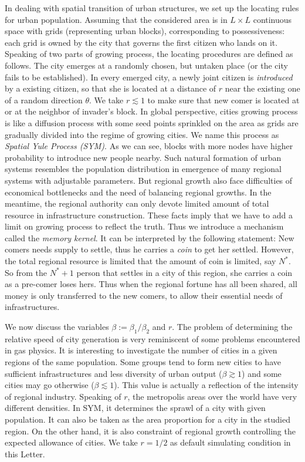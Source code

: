 \documentclass[reprint,unsortedaddress,amsmath,amssymb,aps,prl,fixfloat,showkeys]{revtex4-2}
\begin{document}
In dealing with spatial transition of urban structures, we set up the locating rules for urban population. Assuming that the considered area is in $L\times L$ continuous space with grids (representing urban blocks), corresponding to possessiveness: each grid is owned by the city that governs the first citizen who lands on it. Speaking of two parts of growing process, the locating procedures are defined as follows. The city emerges at a randomly chosen, but untaken place (or the city fails to be established). In every emerged city, a newly joint citizen is \emph{introduced} by a existing citizen, so that she is located at a distance of $r$ near the existing one of a random direction $\theta$. We take $r\lesssim 1$ to make sure that new comer is located at or at the neighbor of invader's block. In global perspective, cities growing process is like a diffusion process\cite{RevModPhys.87.925} with some seed points sprinkled on the area as grids are gradually divided into the regime of growing cities. We name this process as \emph{Spatial Yule Process (SYM)}. As we can see, blocks with more nodes have higher probability to introduce new people nearby. Such natural formation of urban systems resembles the population distribution in emergence of many regional systems with adjustable parameters. But regional growth also face difficulties of economical bottlenecks and the need of balancing regional growths. In the meantime, the regional authority can only devote limited amount of total resource in infrastructure construction. These facts imply that we have to add a limit on growing process to reflect the truth. Thus we introduce a mechanism called the \emph{memory kernel}. It can be interpreted by the following statement: New comers needs supply to settle, thus he carries a \emph{coin} to get her settled. However, the total regional resource is limited that the amount of coin is limited, say $N^*$. So from the $N^*+1$ person that settles in a city of this region, she carries a coin as a pre-comer loses hers. Thus when the regional fortune has all been shared, all money is only transferred to the new comers, to allow their essential needs of infrastructures. 

We now discuss the variables $\beta:=\beta_1/\beta_2$ and $r$. The problem of determining the relative speed of city generation is very reminiscent of some problems encountered in gas physics. It is interesting to investigate the number of cities in a given regions of the same population. Some groups tend to form new cities to have sufficient infrastructures and less diversity of urban output ($\beta\gtrsim 1$) and some cities may go otherwise ($\beta\lesssim 1$). This value is actually a reflection of the intensity of regional industry. Speaking of $r$, the metropolis areas over the world have very different densities. In SYM, it determines the sprawl of a city with given population. It can also be taken as the area proportion for a city in the studied region. On the other hand, it is also constraint of regional growth controlling the expected allowance of cities. We take $r=1/2$ as default simulating condition in this Letter.
\end{document}
